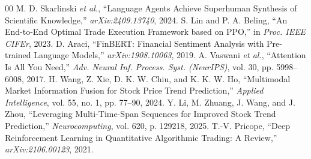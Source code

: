 \documentclass[conference]{IEEEtran}
\begin{document}
\begin{thebibliography}{00}
 M. D. Skarlinski \textit{et al.}, ``Language Agents Achieve Superhuman Synthesis of Scientific Knowledge,'' \textit{arXiv:2409.13740}, 2024.
 S. Lin and P. A. Beling, ``An End-to-End Optimal Trade Execution Framework based on PPO,'' in \textit{Proc. IEEE CIFEr}, 2023.
 D. Araci, ``FinBERT: Financial Sentiment Analysis with Pre-trained Language Models,'' \textit{arXiv:1908.10063}, 2019.
 A. Vaswani \textit{et al.}, ``Attention Is All You Need,'' \textit{Adv. Neural Inf. Process. Syst. (NeurIPS)}, vol. 30, pp. 5998--6008, 2017.
 H. Wang, Z. Xie, D. K. W. Chiu, and K. K. W. Ho, ``Multimodal Market Information Fusion for Stock Price Trend Prediction,'' \textit{Applied Intelligence}, vol. 55, no. 1, pp. 77--90, 2024.
 Y. Li, M. Zhuang, J. Wang, and J. Zhou, ``Leveraging Multi-Time-Span Sequences for Improved Stock Trend Prediction,'' \textit{Neurocomputing}, vol. 620, p. 129218, 2025.
 T.-V. Pricope, ``Deep Reinforcement Learning in Quantitative Algorithmic Trading: A Review,'' \textit{arXiv:2106.00123}, 2021.
\end{thebibliography}
\end{document}
